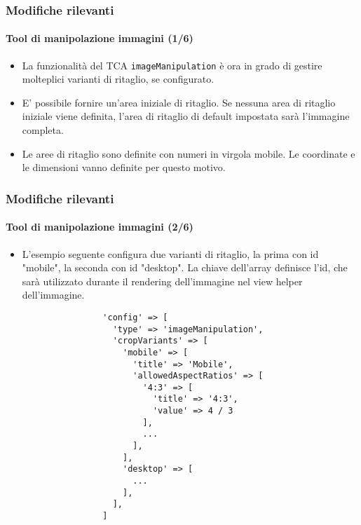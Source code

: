 \begin{frame}[fragile]
	\frametitle{Modifiche rilevanti}
	\framesubtitle{Tool di manipolazione immagini (1/6)}

	\lstset{basicstyle=\tiny\ttfamily}

	\begin{itemize}
		\item La funzionalità del TCA \texttt{imageManipulation} è ora in grado di gestire molteplici varianti di ritaglio, se configurato.

		\item E' possibile fornire un'area iniziale di ritaglio. Se nessuna area di ritaglio iniziale viene definita, l'area di ritaglio di default
			impostata sarà l'immagine completa.
		\item Le aree di ritaglio sono definite con numeri in virgola mobile. Le coordinate e le dimensioni vanno definite
			per questo motivo.

	\end{itemize}

\end{frame}


\begin{frame}[fragile]
	\frametitle{Modifiche rilevanti}
	\framesubtitle{Tool di manipolazione immagini (2/6)}

	\lstset{basicstyle=\tiny\ttfamily}

	\begin{itemize}

		\item L'esempio seguente configura due varianti di ritaglio,
			la prima con id "mobile", la seconda con id "desktop".
			La chiave dell'array definisce l'id, che sarà utilizzato durante
			il rendering dell'immagine nel view helper dell'immagine.

			\begin{lstlisting}
				'config' => [
				  'type' => 'imageManipulation',
				  'cropVariants' => [
				    'mobile' => [
				      'title' => 'Mobile',
				      'allowedAspectRatios' => [
				        '4:3' => [
				          'title' => '4:3',
				          'value' => 4 / 3
				        ],
				        ...
				      ],
				    ],
				    'desktop' => [
				      ...
				    ],
				  ],
				]
			\end{lstlisting}

	\end{itemize}

\end{frame}

